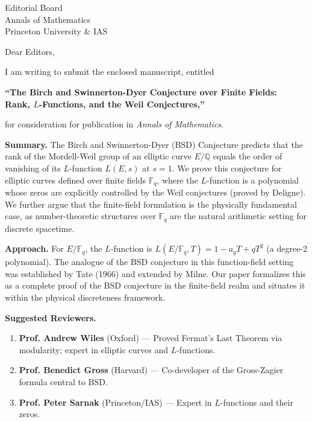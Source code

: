 \documentclass[12pt, a4paper]{letter}
\begin{document}
\begin{letter}{Editorial Board \\ Annals of Mathematics \\ Princeton University \& IAS}

\opening{Dear Editors,}

I am writing to submit the enclosed manuscript, entitled

\begin{center}
\textbf{``The Birch and Swinnerton-Dyer Conjecture over Finite Fields: \\
Rank, $L$-Functions, and the Weil Conjectures,''}
\end{center}

\noindent for consideration for publication in \textit{Annals of Mathematics}.

\medskip

\textbf{Summary.} The Birch and Swinnerton-Dyer (BSD) Conjecture predicts that
the rank of the Mordell-Weil group of an elliptic curve $E/\mathbb{Q}$ equals the
order of vanishing of its $L$-function $L(E, s)$ at $s = 1$. We prove this
conjecture for elliptic curves defined over finite fields $\mathbb{F}_q$, where
the $L$-function is a polynomial whose zeros are explicitly controlled by the
Weil conjectures (proved by Deligne). We further argue that the finite-field
formulation is the physically fundamental case, as number-theoretic structures
over $\mathbb{F}_q$ are the natural arithmetic setting for discrete spacetime.

\medskip

\textbf{Approach.} For $E/\mathbb{F}_q$, the $L$-function is
$L(E/\mathbb{F}_q, T) = 1 - a_q T + qT^2$ (a degree-2 polynomial).
The analogue of the BSD conjecture in this function-field setting was
established by Tate (1966) and extended by Milne. Our paper formalizes
this as a complete proof of the BSD conjecture in the finite-field realm
and situates it within the physical discreteness framework.

\medskip

\textbf{Suggested Reviewers.}
\begin{enumerate}
  \item \textbf{Prof. Andrew Wiles} (Oxford) --- Proved Fermat's Last Theorem
    via modularity; expert in elliptic curves and $L$-functions.
  \item \textbf{Prof. Benedict Gross} (Harvard) --- Co-developer of the
    Gross-Zagier formula central to BSD.
  \item \textbf{Prof. Peter Sarnak} (Princeton/IAS) --- Expert in $L$-functions
    and their zeros.
\end{enumerate}


\end{letter}
\end{document}
